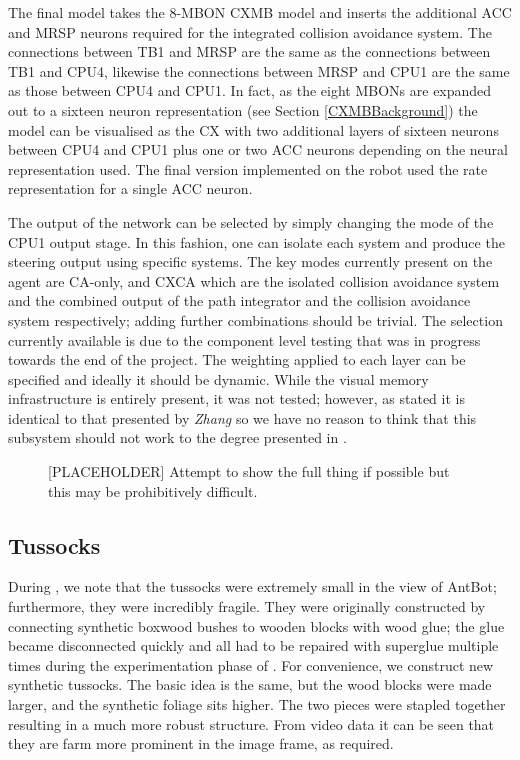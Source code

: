 \documentclass[a4paper,11pt,twoside,openright]{article}
\begin{document}
The final model takes the 8-MBON CXMB model and inserts the additional ACC and
MRSP neurons required for the integrated collision avoidance system. The
connections between TB1 and MRSP are the same as the connections between TB1
and CPU4, likewise the connections between MRSP and CPU1 are the same as those
between CPU4 and CPU1. In fact, as the eight MBONs are expanded out to a
sixteen neuron representation (see Section \ref{CXMBBackground}) the
model can be visualised as the CX with two additional layers of sixteen neurons
between CPU4 and CPU1 plus one or two ACC neurons depending on the neural
representation used. The final version implemented on the robot used the rate
representation for a single ACC neuron.
\newline\par

The output of the network can be selected by simply changing the mode of the
CPU1 output stage. In this fashion, one can isolate each system and produce
the steering output using specific systems. The key modes currently present on
the agent are CA-only, and CXCA which are the isolated collision avoidance system
and the combined output of the path integrator and the collision avoidance
system respectively; adding further combinations should be trivial. The
selection currently available is due to the component level testing that
was in progress towards the end of the project. The weighting applied to each
layer can be specified and ideally it should be dynamic. While the visual
memory infrastructure is entirely present, it was not tested; however, as stated
it is identical to that presented by \textit{Zhang} so we have no reason to
think that this subsystem should not work to the degree presented in
\cite{Zhang2017}.

\begin{figure}
\caption{\label{fig:ecx} [PLACEHOLDER] Attempt to show the full thing if possible
  but this may be prohibitively difficult.}
\end{figure}

\subsection{Tussocks}
During \cite{Mitchell2018}, we note that the tussocks were extremely
small in the view of AntBot; furthermore, they were incredibly
fragile. They were originally constructed by connecting synthetic
boxwood bushes to wooden blocks with wood glue; the glue became
disconnected quickly and all had to be repaired with superglue
multiple times during the experimentation phase of
\cite{Mitchell2018}. For convenience, we construct new synthetic
tussocks. The basic idea is the same, but the wood blocks were made
larger, and the synthetic foliage sits higher. The two pieces were
stapled together resulting in a much more robust structure. From video
data it can be seen that they are farm more prominent in the image
frame, as required.
\end{document}

